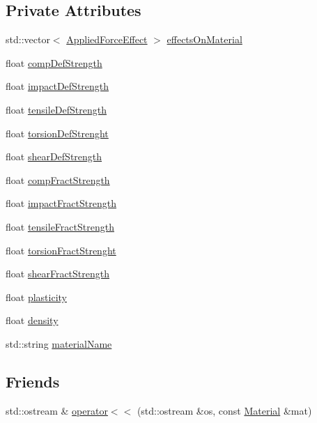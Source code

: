 \subsection*{Private Attributes}
\begin{DoxyCompactItemize}
\item 
std\+::vector$<$ \mbox{\hyperlink{struct_applied_force_effect}{Applied\+Force\+Effect}} $>$ \mbox{\hyperlink{class_material_a566a354d75363261cc0cbafb574d0005}{effects\+On\+Material}}
\item 
float \mbox{\hyperlink{class_material_aefa390f4102803241fa6e04f6b864242}{comp\+Def\+Strength}}
\item 
float \mbox{\hyperlink{class_material_a3c8b5d54e06ce14b269ad549bfdf24e4}{impact\+Def\+Strength}}
\item 
float \mbox{\hyperlink{class_material_a5feaef77f56cd9060b3fe066b829349b}{tensile\+Def\+Strength}}
\item 
float \mbox{\hyperlink{class_material_a87acb6b7a1cd5e88b78ec5a6dbabfef6}{torsion\+Def\+Strenght}}
\item 
float \mbox{\hyperlink{class_material_adffbeb80fbe0e422ab119b60030e1601}{shear\+Def\+Strength}}
\item 
float \mbox{\hyperlink{class_material_a1cd52977a0f51d9fedda700ae08608d8}{comp\+Fract\+Strength}}
\item 
float \mbox{\hyperlink{class_material_af6fa341d8fbe22cfb9b0eeb14a4d358e}{impact\+Fract\+Strength}}
\item 
float \mbox{\hyperlink{class_material_a87b377041cfd15fa6fdd0bddb93b15bf}{tensile\+Fract\+Strength}}
\item 
float \mbox{\hyperlink{class_material_a8e21e3e07c1996ce1131d19ddf459622}{torsion\+Fract\+Strenght}}
\item 
float \mbox{\hyperlink{class_material_a3bd221dcc5f3ad92a9a9559963c119c3}{shear\+Fract\+Strength}}
\item 
float \mbox{\hyperlink{class_material_a4c1c1580edfdd06705fc50635cbcf0ed}{plasticity}}
\item 
float \mbox{\hyperlink{class_material_a1a41cda71ca662151fd22dea29958d55}{density}}
\item 
std\+::string \mbox{\hyperlink{class_material_a771ccd99d734e031de1a0d07fabae0c8}{material\+Name}}
\end{DoxyCompactItemize}
\subsection*{Friends}
\begin{DoxyCompactItemize}
\item 
std\+::ostream \& \mbox{\hyperlink{class_material_a5bfba11792fa55afcf4fec622c4a4f4b}{operator$<$$<$}} (std\+::ostream \&os, const \mbox{\hyperlink{class_material}{Material}} \&mat)
\end{DoxyCompactItemize}


